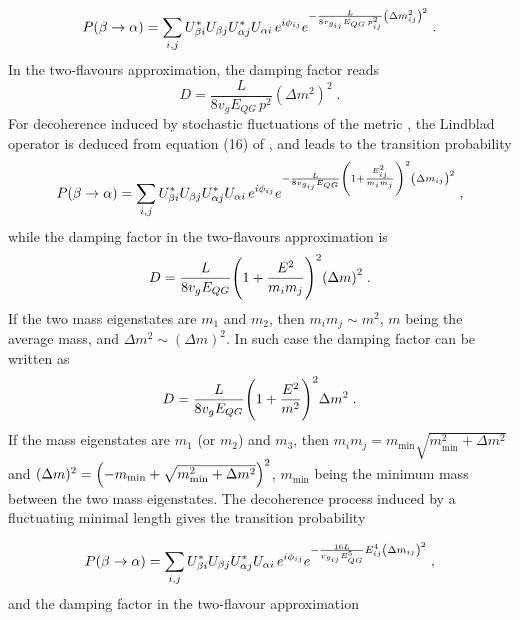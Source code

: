 \documentclass[11pt]{article}
\begin{document}
\begin{equation}
    P(\beta\to\alpha)  = \sum_{i,j} U^*_{\beta i} U_{\beta j} U^*_{\alpha j} U_{\alpha i} \,e^{i \phi_{ij}} e^{-\frac{L}{8v_{g_{ij}}E_{QG}\,p^2_{ij}}\qty(\Delta m_{ij}^2)^2}\;.\label{Oscillation probability decoh arzano}
\end{equation}
In the two-flavours approximation, the damping factor reads
\begin{equation}\label{damping factor 2 flavours arzano}
    D = \frac{L}{8v_gE_{QG} \,p^2}(\Delta m^2)^2\;.
\end{equation}
For decoherence induced by  stochastic fluctuations of the metric  \cite{Breuer:2008rh}, the Lindblad operator  is deduced from  equation (16) of \cite{Breuer:2008rh}, and leads to the transition probability 
    \begin{equation}
        P(\beta\to\alpha) = \sum_{i,j} U^*_{\beta i} U_{\beta j} U^*_{\alpha j} U_{\alpha i} \,e^{i \phi_{ij}} e^{-\frac{L}{8v_{g_{ij}}E_{QG}}\qty(1+\frac{E_{ij}^2}{m_im_j})^2\qty(\Delta m_{ij})^2}\;,\label{Oscillation probability decoh Breuer}
    \end{equation}
    while the damping factor in the two-flavours approximation is
    \begin{equation}\label{damping factor 2 flavours analysis Breuer}
        D = \frac{L}{8v_{g}E_{QG}}\qty(1+\frac{E^2}{m_im_j})^2\qty(\Delta m)^2\;.
    \end{equation}
  If the two mass eigenstates are $m_1$ and $m_2$, then $m_im_j \sim m^2$, $m$ being the average mass, and $\Delta m^2 \sim (\Delta m)^2$. In such case the damping factor can be written as
        \begin{equation}\label{damping factor 2 flavours analysis Breuer degeneracy}
        D = \frac{L}{8v_{g}E_{QG}}\qty(1+\frac{E^2}{m^2})^2\Delta m^2\;.
    \end{equation}  
    If  the mass eigenstates are $m_1$ (or $m_2$) and $m_3$, then  $m_im_j = m_{\text{min}}\sqrt{m^2_{\text{min}}+\Delta m^2}$ and $(\Delta m)^2 = \qty(-m_{\text{min}}+\sqrt{m^2_{\text{min}}+\Delta m^2})^2$, $m_{\text{min}}$ being the minimum mass between the two mass eigenstates.
    The decoherence process induced by a fluctuating minimal length \cite{Petruzziello:2020wkd} gives the transition probability
    
    \begin{equation}
         P(\beta\to\alpha) = \sum_{i,j} U^*_{\beta i} U_{\beta j} U^*_{\alpha j} U_{\alpha i} \,e^{i \phi_{ij}} e^{-\frac{16L}{v_{g_{ij}}E_{QG}^5}E_{ij}^4\qty(\Delta m_{ij})^2}\;,\label{Oscillation probability decoh Petruziello}
    \end{equation}
    and the damping factor in the two-flavour approximation 
\end{document}
